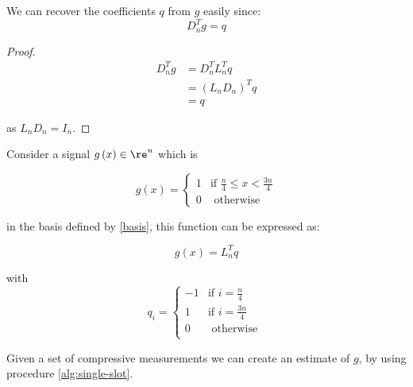 \begin{proposition}
We can recover the coefficients \(q\) from \(g\) easily since:
\begin{equation}
D_n^Tg = q
\end{equation}
\label{def:a}
\end{proposition}
\begin{proof}

\begin{align}
D_n^Tg &= D_n^T L_n^T q \\
&= \left(L_nD_n\right)^Tq \\
&= q
\end{align}

as \(L_nD_n = I_n\).

\end{proof}

\begin{example}
Consider a signal \(g\left(x\right) \in \re^n\) which is 

\begin{equation}
g\left(x\right) =
\begin{cases}
1 & \text{if } \frac{n}{4} \leq x < \frac{3n}{4} \\
0 & \text{ otherwise } 
\end{cases}
\end{equation}

in the basis defined by \eqref{basis}, this function can be expressed as:

\begin{equation}
g\left(x\right) = L_n^Tq
\end{equation}

with 
\begin{equation}
q_i =
\begin{cases}
-1 & \text{if } i = \frac{n}{4} \\
1 & \text{if } i = \frac{3n}{4} \\
0 & \text{ otherwise } \\
\end{cases}
\end{equation}

\end{example}

Given a set of compressive measurements we can create an estimate of \(g\), by using procedure \ref{alg:single-slot}.

